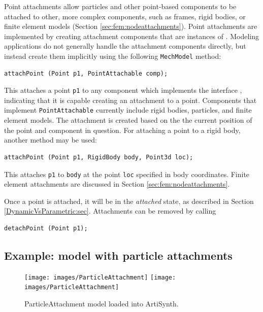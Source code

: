 Point attachments allow particles and other point-based components to
be attached to other, more complex components, such as frames, rigid
bodies, or finite element models (Section \ref{sec:fem:nodeattachments}). Point
attachments are implemented by creating attachment components that are
instances of .
Modeling applications do not generally handle the attachment
components directly, but instead create them implicitly using the
following {\tt MechModel} method:
%
\begin{lstlisting}[]
  attachPoint (Point p1, PointAttachable comp);
\end{lstlisting}
%
This attaches a point {\tt p1} to any component which implements the
interface ,
indicating that it is capable creating an attachment to a
point. Components that implement {\tt PointAttachable} currently
include rigid bodies, particles, and finite element models. The
attachment is created based on the the current position of the point
and component in question.  For attaching a point to a rigid body,
another method may be used:
%
\begin{lstlisting}[]
  attachPoint (Point p1, RigidBody body, Point3d loc);
\end{lstlisting}
%
This attaches {\tt p1} to {\tt body} at the point {\tt loc} specified
in body coordinates.  Finite element attachments are discussed in
Section \ref{sec:fem:nodeattachments}.

Once a point is attached, it
will be in the {\it attached} state, as described in Section
\ref{DynamicVsParametric:sec}.  Attachments can be removed by
calling
%
\begin{lstlisting}[]
  detachPoint (Point p1);   
\end{lstlisting}
%

\subsection{Example: model with particle attachments}

\begin{figure}[ht]
\begin{center}
\iflatexml
 \texttt{[image: images/ParticleAttachment]}
\else
 \texttt{[image: images/ParticleAttachment]}
\fi
\end{center}
\caption{ParticleAttachment model loaded into ArtiSynth.}
\label{ParticleAttachment:fig}
\end{figure}

